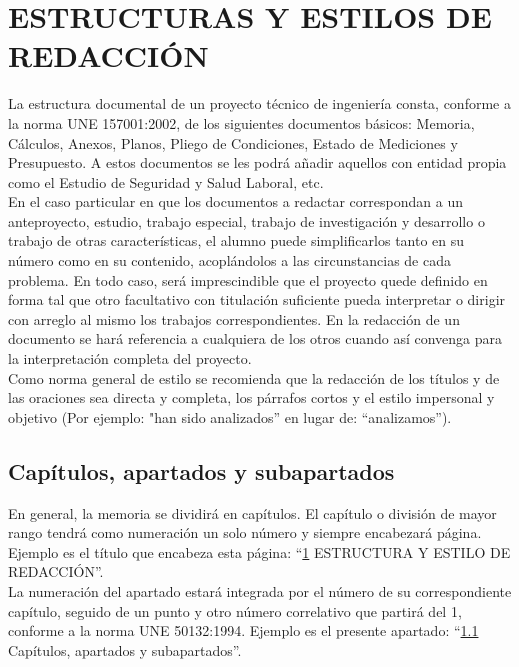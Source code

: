 \section{ESTRUCTURAS Y ESTILOS DE REDACCIÓN} \label{sec:Estructuras}
La estructura documental de un proyecto técnico de ingeniería consta, conforme a la norma UNE 157001:2002, de los siguientes documentos básicos: Memoria, Cálculos, Anexos, Planos, Pliego de Condiciones, Estado de Mediciones y Presupuesto. A estos documentos se les podrá añadir aquellos con entidad propia como el Estudio de Seguridad y Salud Laboral, etc.\\

En el caso particular en que los documentos a redactar correspondan a un anteproyecto, estudio, trabajo especial, trabajo de investigación y desarrollo o trabajo de otras características, el alumno puede simplificarlos tanto en su número como en su contenido, acoplándolos a las circunstancias de cada problema. En todo caso, será imprescindible que el proyecto quede definido en forma tal que otro facultativo con titulación suficiente pueda interpretar o dirigir con arreglo al mismo los trabajos correspondientes. En la redacción de un documento se hará referencia a cualquiera de los otros cuando así convenga para la interpretación completa del proyecto.\\

Como norma general de estilo se recomienda que la redacción de los títulos y de las oraciones sea directa y completa, los párrafos cortos y el estilo impersonal y objetivo (Por ejemplo: "han sido analizados” en lugar de: “analizamos”).

\subsection{Capítulos, apartados y subapartados} \label{sec:Capitulos}

En general, la memoria se dividirá en capítulos. El capítulo o división de mayor rango tendrá como numeración un solo número y siempre encabezará página. Ejemplo es el título que encabeza esta página: “\ref{sec:Estructuras} ESTRUCTURA Y ESTILO DE REDACCIÓN”.\\

La numeración del apartado estará integrada por el número de su correspondiente capítulo, seguido de un punto y otro número correlativo que partirá del 1, conforme a la norma UNE 50132:1994. Ejemplo es el presente apartado: “\ref{sec:Capitulos} Capítulos, apartados y subapartados”.

